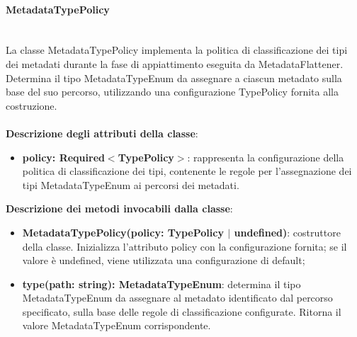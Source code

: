 \documentclass[a4paper,12pt]{article}
\begin{document}
{                \paragraph{MetadataTypePolicy}\label{par:MetadataTypePolicy}\mbox{}\\
                La classe MetadataTypePolicy implementa la politica di classificazione dei tipi dei metadati durante la fase di appiattimento eseguita da MetadataFlattener. Determina il tipo MetadataTypeEnum da assegnare a ciascun metadato sulla base del suo percorso, utilizzando una configurazione TypePolicy fornita alla costruzione.\\
                \\
                \textbf{Descrizione degli attributi della classe}:
                \begin{itemize}
                    \item \textbf{policy: Required$<$TypePolicy$>$}: rappresenta la configurazione della politica di classificazione dei tipi, contenente le regole per l'assegnazione dei tipi MetadataTypeEnum ai percorsi dei metadati.
                \end{itemize}
 
                \noindent \textbf{Descrizione dei metodi invocabili dalla classe}:
                \begin{itemize}
                    \item \textbf{MetadataTypePolicy(policy: TypePolicy $|$ undefined)}: costruttore della classe. Inizializza l'attributo policy con la configurazione fornita; se il valore è undefined, viene utilizzata una configurazione di default;
                    \item \textbf{type(path: string): MetadataTypeEnum}: determina il tipo MetadataTypeEnum da assegnare al metadato identificato dal percorso specificato, sulla base delle regole di classificazione configurate. Ritorna il valore MetadataTypeEnum corrispondente.
                \end{itemize}
 
}
\end{document}
